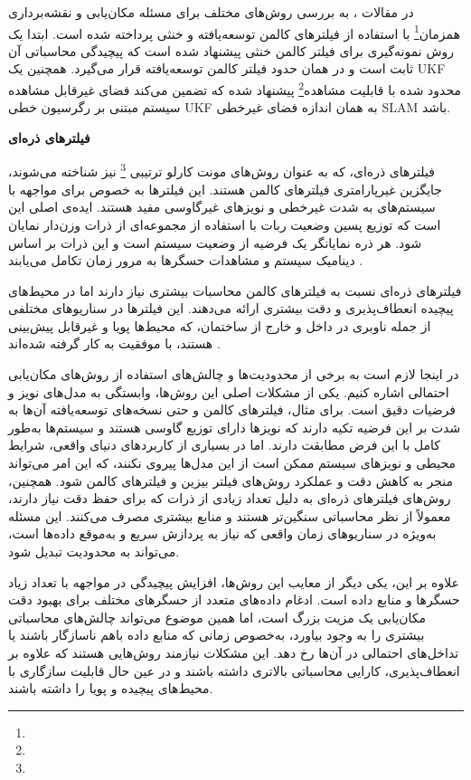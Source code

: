  
در مقالات 
\cite{huang2013quadratic, kim2008unscented, cheng2014compressed}
، به بررسی روش‌های مختلف برای مسئله مکان‌یابی و نقشه‌برداری همزمان\footnote{}
 با استفاده از فیلترهای کالمن توسعه‌یافته و خنثی پرداخته شده است. ابتدا یک روش نمونه‌گیری برای فیلتر کالمن خنثی پیشنهاد شده است که پیچیدگی محاسباتی آن ثابت است و در همان حدود فیلتر کالمن توسعه‌یافته قرار می‌گیرد. همچنین یک UKF محدود شده با قابلیت مشاهده\footnote{} پیشنهاد شده که تضمین می‌کند فضای غیرقابل مشاهده سیستم مبتنی بر رگرسیون خطی UKF به همان اندازه فضای غیرخطی SLAM باشد.
 

\textbf {فیلترهای ذره‌ای}

فیلترهای ذره‌ای، که به عنوان روش‌های مونت کارلو ترتیبی
\footnote{}
 نیز شناخته می‌شوند، جایگزین غیرپارامتری فیلترهای کالمن هستند. این فیلترها به خصوص برای مواجهه با سیستم‌های به شدت غیرخطی و نویزهای غیرگاوسی مفید هستند. ایده‌ی اصلی این است که توزیع پسین وضعیت ربات با استفاده از مجموعه‌ای از ذرات وزن‌دار نمایان شود. هر ذره نمایانگر یک فرضیه از وضعیت سیستم است و این ذرات بر اساس دینامیک سیستم و مشاهدات حسگرها به مرور زمان تکامل می‌یابند
\cite{fox2001particle}.

فیلترهای ذره‌ای نسبت به فیلترهای کالمن محاسبات بیشتری نیاز دارند اما در محیط‌های پیچیده انعطاف‌پذیری و دقت بیشتری ارائه می‌دهند. این فیلترها در سناریوهای مختلفی از جمله ناوبری در داخل و خارج از ساختمان، که محیط‌ها پویا و غیرقابل پیش‌بینی هستند، با موفقیت به کار گرفته شده‌اند
 \cite{fox2001particle, montemerlo2002conditional, kwok2003adaptive}.

در اینجا لازم است به برخی از محدودیت‌ها و چالش‌های استفاده از روش‌های مکان‌یابی احتمالی اشاره کنیم. یکی از مشکلات اصلی این روش‌ها، وابستگی به مدل‌های نویز و فرضیات دقیق است. برای مثال، فیلترهای کالمن و حتی نسخه‌های توسعه‌یافته آن‌ها به شدت بر این فرضیه تکیه دارند که نویزها دارای توزیع گاوسی هستند و سیستم‌ها به‌طور کامل با این فرض مطابقت دارند. اما در بسیاری از کاربردهای دنیای واقعی، شرایط محیطی و نویزهای سیستم ممکن است از این مدل‌ها پیروی نکنند، که این امر می‌تواند منجر به کاهش دقت و عملکرد روش‌های فیلتر بیزین و فیلترهای کالمن شود. همچنین، روش‌های فیلترهای ذره‌ای به دلیل تعداد زیادی از ذرات که برای حفظ دقت نیاز دارند، معمولاً از نظر محاسباتی سنگین‌تر هستند و منابع بیشتری مصرف می‌کنند. این مسئله به‌ویژه در سناریوهای زمان واقعی که نیاز به پردازش سریع و به‌موقع داده‌ها است، می‌تواند به محدودیت تبدیل شود.

علاوه بر این، یکی دیگر از معایب این روش‌ها، افزایش پیچیدگی در مواجهه با تعداد زیاد حسگرها و منابع داده است. ادغام داده‌های متعدد از حسگرهای مختلف برای بهبود دقت مکان‌یابی یک مزیت بزرگ است، اما همین موضوع می‌تواند چالش‌های محاسباتی بیشتری را به وجود بیاورد، به‌خصوص زمانی که منابع داده باهم ناسازگار باشند یا تداخل‌های احتمالی در آن‌ها رخ دهد. این مشکلات نیازمند روش‌هایی هستند که علاوه بر انعطاف‌پذیری، کارایی محاسباتی بالاتری داشته باشند و در عین حال قابلیت سازگاری با محیط‌های پیچیده و پویا را داشته باشند.

